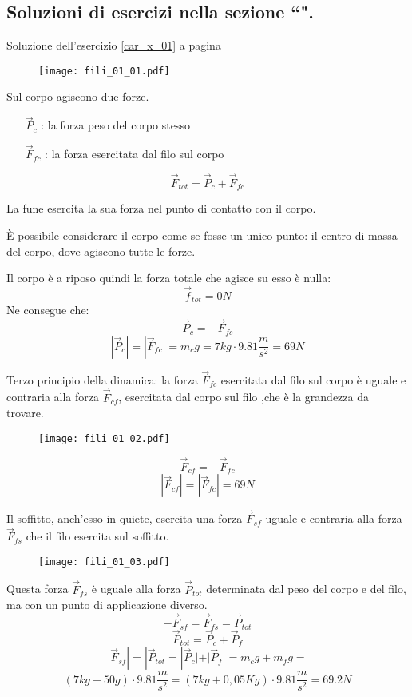 
\subsection*{Soluzioni di esercizi nella sezione ``\textbf{}".}

Soluzione dell'esercizio \ref{car_x_01} a pagina \pageref{car_x_01}\label{car_s_01}

\begin{figure}[h]
\centering
\texttt{[image: fili\_01\_01.pdf]}
\end{figure}

Sul corpo agiscono due forze.
\begin{enumerate}
\item[$\vec{P}_c$] : la forza peso del corpo stesso 
\item[$\vec{F}_{fc}$]: la forza esercitata dal filo sul corpo
\end{enumerate}

\[ \vec{F}_{tot} = \vec{P}_c+\vec{F}_{fc} \]

La fune esercita la sua forza nel punto di contatto con il corpo.

È possibile considerare il corpo come se fosse un unico punto: il centro di massa
del corpo, dove agiscono tutte le forze.

Il corpo è a riposo quindi la forza totale che agisce su esso è nulla: 
\[ \vec{f}_{tot} = 0 N \]
Ne consegue che:
\[  \vec{P}_c = -\vec{F}_{fc} \]
\[ | \vec{P}_c | =  |\vec{F}_{fc} | = m_cg =7kg\cdot 9.81 \frac{m}{s^2} = 69N \]

Terzo principio della dinamica: la forza $\vec{F}_{fc}$ esercitata dal filo sul 
corpo è uguale e contraria alla forza $\vec{F}_{cf}$, esercitata dal corpo sul filo
,che è la grandezza da trovare.

\begin{figure}[h]
\centering
\texttt{[image: fili\_01\_02.pdf]}
\end{figure}

\[ \vec{F}_{cf} = - \vec{F}_{fc} \]
\[ | \vec{F}_{cf} | = | \vec{F}_{fc} | = 69 N \]

Il soffitto, anch’esso in quiete, esercita una forza $\vec{F}_{sf}$
uguale e contraria alla forza $\vec{F}_{fs}$ che il filo esercita sul soffitto.

\begin{figure}[h]
\centering
\texttt{[image: fili\_01\_03.pdf]}
\end{figure}

Questa forza $\vec{F}_{fs}$ è uguale alla forza $\vec{P}_{tot}$
determinata dal peso del corpo e del filo, ma con un punto di applicazione
diverso.
\[ - \vec{F}_{sf} = \vec{F}_{fs} = \vec{P}_{tot} \]
\[ \vec{P}_{tot} = \vec{P}_c + \vec{P}_f \]
\[ |\vec{F}_{sf}| = |\vec{P}_{tot} = | \vec{P}_c | + | \vec{P}_f  | = m_cg+m_fg= \]
\[ (7 kg + 50 g) \cdot 9.81 \frac{m}{s^2} = (7 kg + 0,05 Kg) \cdot 9.81 \frac{m}{s^2}
= 69.2 N \]


